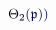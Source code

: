 \documentclass[12pt]{article}
\begin{document}
\makeatletter
\renewcommand*{\@textcolor}[3]{%
  \protect\leavevmode
  \begingroup
    \color#1{#2}#3%
  \endgroup
}
\makeatother
\begin{displaymath}
\mathcolor[RGB]{0,0,15}{\Theta} _ { \mathcolor[RGB]{0,0,30}{2} } \mathcolor[RGB]{0,0,45}{(} \mathfrak { \mathcolor[RGB]{0,0,60}{p} } \mathcolor[RGB]{0,0,75}{)} \mathcolor[RGB]{0,0,90}{)}
\end{displaymath}
\end{document}
